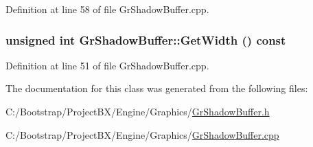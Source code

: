 Definition at line 58 of file GrShadowBuffer.cpp.\hypertarget{class_gr_shadow_buffer_48b42cb4ab666f7b920a4bed33ce1a2d}{
\subsubsection[{GetWidth}]{\setlength{\rightskip}{0pt plus 5cm}unsigned int GrShadowBuffer::GetWidth () const}}
\label{class_gr_shadow_buffer_48b42cb4ab666f7b920a4bed33ce1a2d}




Definition at line 51 of file GrShadowBuffer.cpp.

The documentation for this class was generated from the following files:\begin{CompactItemize}
\item 
C:/Bootstrap/ProjectBX/Engine/Graphics/\hyperlink{_gr_shadow_buffer_8h}{GrShadowBuffer.h}\item 
C:/Bootstrap/ProjectBX/Engine/Graphics/\hyperlink{_gr_shadow_buffer_8cpp}{GrShadowBuffer.cpp}\end{CompactItemize}
